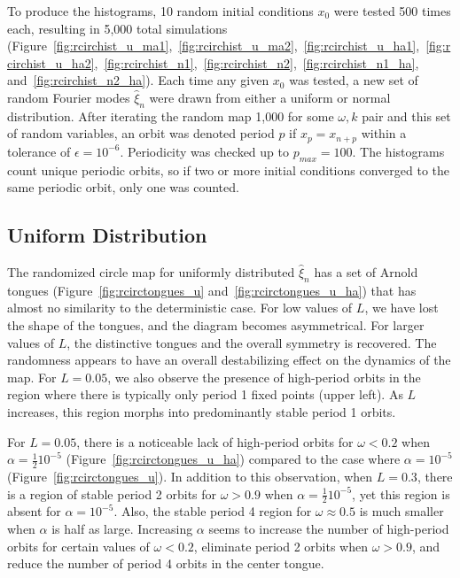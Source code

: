 To produce the histograms, 10 random initial conditions $x_0$ were tested 500 times
each, resulting in 5,000 total simulations
(Figure~\ref{fig:rcirchist_u_ma1},~\ref{fig:rcirchist_u_ma2},~\ref{fig:rcirchist_u_ha1},~\ref{fig:rcirchist_u_ha2},~\ref{fig:rcirchist_n1},~\ref{fig:rcirchist_n2},~\ref{fig:rcirchist_n1_ha}, and~\ref{fig:rcirchist_n2_ha}). Each time any given $x_0$
was tested, a new set of random Fourier modes $\hat{\xi}_n$ were drawn
from either a uniform or normal distribution. After iterating the random
map 1,000 for some $\omega,k$ pair and this set of random variables, an orbit was denoted period $p$ if $x_p = x_{n+p}$ within a
tolerance of $\epsilon = 10^{-6}$. Periodicity was checked up to
$p_{max}=100$. The histograms count unique periodic orbits, so if two
or more initial conditions converged to the same periodic orbit, only
one was counted. 
\subsection{Uniform Distribution}
The randomized circle map for uniformly distributed $\hat{\xi}_n$ has
a set of Arnold tongues (Figure~\ref{fig:rcirctongues_u} and~\ref{fig:rcirctongues_u_ha}) that has almost no similarity to the deterministic
case. For low values of $L$, we have lost the
shape of the tongues, and the diagram becomes asymmetrical. For larger
values of $L$, the distinctive tongues and the overall symmetry is
recovered. The randomness appears to have an overall destabilizing
effect on the dynamics of the map. For $L=0.05$, we also observe the
presence of high-period orbits in the region where there is typically
only period 1 fixed points (upper left). As $L$ increases, this region
morphs into predominantly stable period 1 orbits. 

For $L=0.05$, there is a noticeable lack of high-period orbits for
$\omega<0.2$ when $\alpha = \frac{1}{2}10^{-5}$
(Figure~\ref{fig:rcirctongues_u_ha}) compared to the case where
$\alpha = 10^{-5}$ (Figure~\ref{fig:rcirctongues_u}). In addition to
this observation, when $L=0.3$, there is a region of stable period 2
orbits for $\omega > 0.9$ when $\alpha = \frac{1}{2}10^{-5}$, yet this
region is absent for $\alpha = 10^{-5}$. Also, the stable period 4
region for $\omega \approx 0.5$ is much smaller when $\alpha$ is half
as large. Increasing $\alpha$ seems to increase the number of
high-period orbits for certain values of $\omega < 0.2$, eliminate period
2 orbits when $\omega >0.9$, and reduce the number of period 4 orbits
in the center tongue. 

